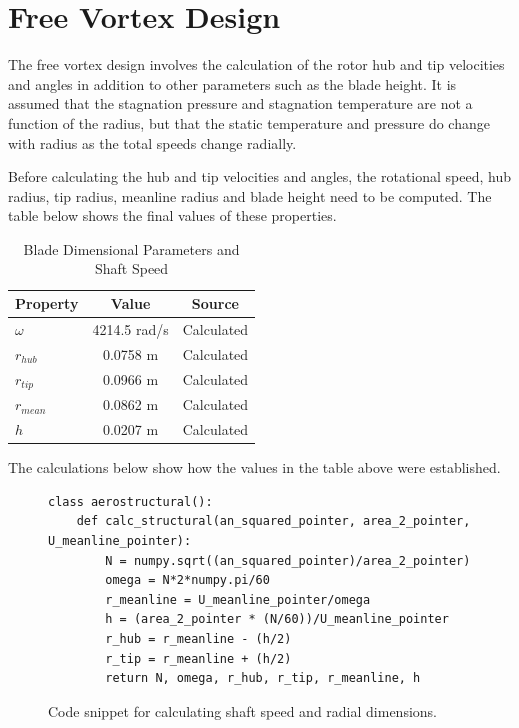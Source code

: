 \documentclass[12pt, letter]{report}
\begin{document}
\section{Free Vortex Design}
The free vortex design involves the calculation of the rotor hub and tip velocities and angles in addition to other parameters such as the blade height. It is assumed that the stagnation pressure and stagnation temperature are not a function of the radius, but that the static temperature and pressure do change with radius as the total speeds change radially. 

Before calculating the hub and tip velocities and angles, the rotational speed, hub radius, tip radius, meanline radius and blade height need to be computed. The table below shows the final values of these properties. 

\begin{table}[H]
\caption{Blade Dimensional Parameters and Shaft Speed}
\centering
\begin{tabular}{|l|c|c|}
\hline
\textbf{Property} & \textbf{Value} & \textbf{Source} \\ \hline
$\omega$ & 4214.5 rad/s & Calculated\\ \hline
$r_{hub}$ & 0.0758 m & Calculated\\ \hline
$r_{tip}$ &0.0966 m & Calculated\\ \hline
$r_{mean}$ &0.0862 m & Calculated\\ \hline
$h$ & 0.0207 m & Calculated \\\hline
\end{tabular} 
\label{tab:my_label}
\end{table}
\par

The calculations below show how the values in the table above were established. 

\begin{figure}[H]
    \begin{verbatim}
class aerostructural():
    def calc_structural(an_squared_pointer, area_2_pointer, U_meanline_pointer):
        N = numpy.sqrt((an_squared_pointer)/area_2_pointer)
        omega = N*2*numpy.pi/60
        r_meanline = U_meanline_pointer/omega
        h = (area_2_pointer * (N/60))/U_meanline_pointer
        r_hub = r_meanline - (h/2)
        r_tip = r_meanline + (h/2)
        return N, omega, r_hub, r_tip, r_meanline, h
    \end{verbatim}
    \caption{Code snippet for calculating shaft speed and radial dimensions.}
    \label{fig:code_structural}
\end{figure}
\end{document}
